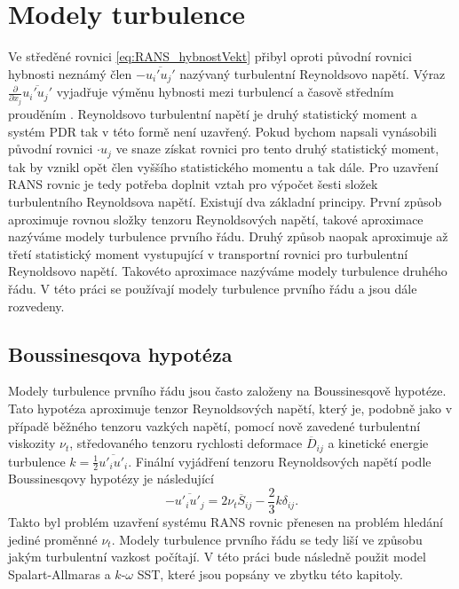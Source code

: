 \section{Modely turbulence}
Ve středěné rovnici \ref{eq:RANS_hybnostVekt} přibyl oproti původní rovnici hybnosti neznámý člen $-\overline{u_i' u_j'}$ nazývaný turbulentní Reynoldsovo napětí. Výraz $ \frac{\partial}{\partial x_j}\overline{u_i' u_j'} $ vyjadřuje výměnu hybnosti mezi turbulencí a časově středním prouděním \cite{dvorak1987vnitrniaerodynamika}. Reynoldsovo turbulentní napětí je druhý statistický moment a systém PDR tak v této formě není uzavřený. Pokud bychom napsali vynásobili původní rovnici $ \cdot u_j $ ve snaze získat rovnici pro tento druhý statistický moment, tak by vznikl opět člen vyššího statistického momentu a tak dále. Pro uzavření RANS rovnic je tedy potřeba doplnit vztah pro výpočet šesti složek turbulentního Reynoldsova napětí. Existují dva základní principy. První způsob aproximuje rovnou složky tenzoru Reynoldsových napětí, takové aproximace nazýváme modely turbulence prvního řádu. Druhý způsob naopak aproximuje až třetí statistický moment vystupující v transportní rovnici pro turbulentní Reynoldsovo napětí. Takovéto aproximace nazýváme modely turbulence druhého řádu. V této práci se používají modely turbulence prvního řádu a jsou dále rozvedeny.

\subsection{Boussinesqova hypotéza}
Modely turbulence prvního řádu jsou často založeny na Boussinesqově hypotéze. Tato hypotéza aproximuje tenzor Reynoldsových napětí, který je, podobně jako v případě běžného tenzoru vazkých napětí, pomocí nově zavedené turbulentní viskozity $\nu_t$, středovaného tenzoru rychlosti deformace $\overline{D}_{ij}$ a kinetické energie turbulence $k= \frac{1}{2}\overline{u'_i u'_i}$. Finální vyjádření tenzoru Reynoldsových napětí podle Boussinesqovy hypotézy je následující
\begin{equation}\label{eq:boussinesq}
-\overline{u'_i u'_j} = 2\nu_t \overline{S}_{ij} -\frac{2}{3}k\delta_{ij}.
\end{equation}
Takto byl problém uzavření systému RANS rovnic přenesen na problém hledání jediné proměnné $ \nu_t $. Modely turbulence prvního řádu se tedy liší ve způsobu jakým turbulentní vazkost počítají. V této práci bude následně použit model Spalart-Allmaras a $k\text{-}\omega$ SST, které jsou popsány ve zbytku této kapitoly.

